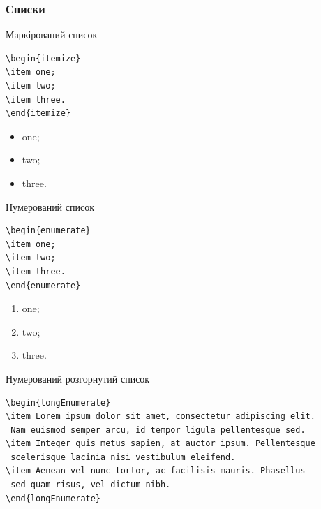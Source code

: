 \subsubsection{Списки}

Маркірований список

\begin{framed}\small
\begin{lstlisting}
\begin{itemize}
\item one;
\item two;
\item three.
\end{itemize}
\end{lstlisting}
\end{framed}

\begin{itemize}
\item one;
\item two;
\item three.
\end{itemize}

Нумерований список

\begin{framed}\small
\begin{lstlisting}
\begin{enumerate}
\item one;
\item two;
\item three.
\end{enumerate}
\end{lstlisting}
\end{framed}

\begin{enumerate}
\item one;
\item two;
\item three.
\end{enumerate}

Нумерований розгорнутий список

\begin{framed}\small
\begin{lstlisting}
\begin{longEnumerate}
\item Lorem ipsum dolor sit amet, consectetur adipiscing elit. 
 Nam euismod semper arcu, id tempor ligula pellentesque sed.
\item Integer quis metus sapien, at auctor ipsum. Pellentesque
 scelerisque lacinia nisi vestibulum eleifend.
\item Aenean vel nunc tortor, ac facilisis mauris. Phasellus
 sed quam risus, vel dictum nibh.
\end{longEnumerate}
\end{lstlisting}
\end{framed}

